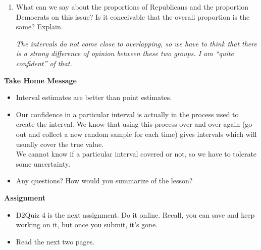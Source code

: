 \begin{enumerate}
\begin{enumerate}
\begin{key}
  {\em We are 95\% confident that the true }
\end{key}

\item What can we say about the proportions of Republicans and the
  proportion Democrats on this issue? Is it conceivable that the
  overall proportion is the same?  Explain.

\begin{students}
\vspace{2cm}
\end{students}

\begin{key}
  {\em The intervals do not come close to overlapping, so we have to
    think that there is a strong difference of opinion between these
    two groups. I am ``quite confident'' of that.}
\end{key}
    \end{enumerate}
  
  \end{enumerate}


\begin{center}
  {\large \bf Take Home Message} 
\end{center}

\begin{itemize}
\item Interval estimates are better than point estimates.
\item Our confidence in a particular interval is actually in the
  process used to create the interval.  We know that using this
  process over and over again (go out and collect a new random sample
  for each time) gives intervals which will usually
  cover the true value.\\
   We cannot know if a particular interval covered or not, so we have
   to  tolerate some uncertainty.
 \item 
  Any questions? How would you  summarize of the  lesson?
\end{itemize}





\noindent
{\bf Assignment}
\begin{itemize}
\item D2Quiz 4 is the next assignment. Do it online. Recall, you can
  save and keep working on it, but once you submit, it's gone.
\item Read the next two pages.
\end{itemize}

